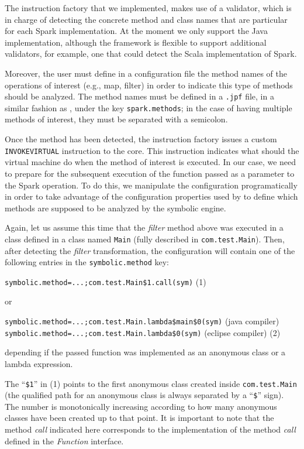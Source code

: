 The instruction factory that we implemented, makes use of a validator, which is in charge of detecting the concrete method and class names that are particular for each Spark implementation. At the moment we only support the Java implementation, although the framework is flexible to support additional validators, for example, one that could detect the Scala implementation of Spark.

Moreover, the user must define in a configuration file the method names of the operations of interest (e.g., map, filter) in order to indicate this type of methods should be analyzed. The method names must be defined in a \texttt{.jpf} file, in a similar fashion as \spf{}, under the key \texttt{spark.methods}; in the case of having multiple methods of interest, they must be separated with a semicolon.

Once the method has been detected, the instruction factory issues a custom \texttt{INVOKEVIRTUAL} instruction to the \jpf{} core. This instruction indicates what should the \jpf{} virtual machine do when the method of interest is executed. In our case, we need to prepare for the subsequent execution of the function passed as a parameter to the Spark operation. To do this, we manipulate the \jpf{} configuration programatically in order to take advantage of the configuration properties used by \spf{} to define which methods are supposed to be analyzed by the symbolic engine.

Again, let us assume this time that the \textit{filter} method above was executed in a class defined in a class named \texttt{Main} (fully described in \texttt{com.test.Main}). Then, after detecting the \textit{filter} transformation, the configuration will contain one of the following entries in the \texttt{symbolic.method} key:

\hspace*{1cm} \lstinline[]|symbolic.method=...;com.test.Main$1.call(sym)|  \hfill (1)

or

\hspace*{1cm} \lstinline[]|symbolic.method=...;com.test.Main.lambda$main$0(sym)| (java compiler) \\
\hspace*{1cm} \lstinline[]|symbolic.method=...;com.test.Main.lambda$0(sym)| (eclipse compiler) \hfill (2)

depending if the passed function was implemented as an anonymous class or a lambda expression. 

The ``\texttt{\$1}'' in (1) points to the first anonymous class created inside \texttt{com.test.Main} (the qualified path for an anonymous class is always separated by a ``\texttt{\$}'' sign). The number is monotonically increasing according to how many anonymous classes have been created up to that point. It is important to note that the method \textit{call} indicated here corresponds to the implementation of the method \textit{call} defined in the \textit{Function} interface.

